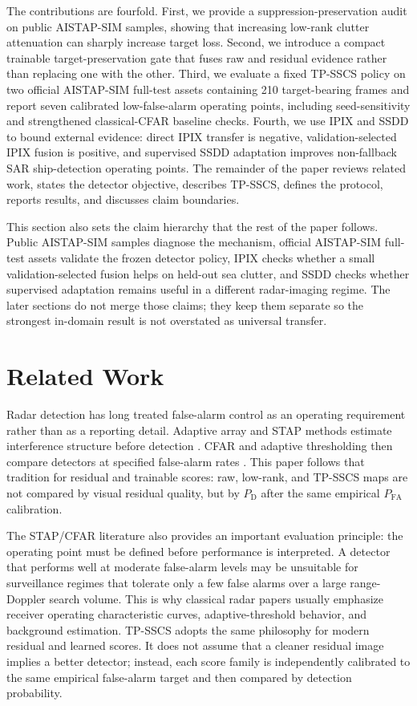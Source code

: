 \documentclass[journal]{IEEEtran}
\begin{document}
The contributions are fourfold. First, we provide a suppression-preservation audit on public AISTAP-SIM samples, showing that increasing low-rank clutter attenuation can sharply increase target loss. Second, we introduce a compact trainable target-preservation gate that fuses raw and residual evidence rather than replacing one with the other. Third, we evaluate a fixed TP-SSCS policy on two official AISTAP-SIM full-test assets containing 210 target-bearing frames and report seven calibrated low-false-alarm operating points, including seed-sensitivity and strengthened classical-CFAR baseline checks. Fourth, we use IPIX and SSDD to bound external evidence: direct IPIX transfer is negative, validation-selected IPIX fusion is positive, and supervised SSDD adaptation improves non-fallback SAR ship-detection operating points. The remainder of the paper reviews related work, states the detector objective, describes TP-SSCS, defines the protocol, reports results, and discusses claim boundaries.

This section also sets the claim hierarchy that the rest of the paper follows. Public AISTAP-SIM samples diagnose the mechanism, official AISTAP-SIM full-test assets validate the frozen detector policy, IPIX checks whether a small validation-selected fusion helps on held-out sea clutter, and SSDD checks whether supervised adaptation remains useful in a different radar-imaging regime. The later sections do not merge those claims; they keep them separate so the strongest in-domain result is not overstated as universal transfer.

\section{Related Work}

Radar detection has long treated false-alarm control as an operating requirement rather than as a reporting detail. Adaptive array and STAP methods estimate interference structure before detection \cite{reed1974adaptive,melvin2004stap,melvin2014stap}. CFAR and adaptive thresholding then compare detectors at specified false-alarm rates \cite{rohling1983cfar,kelly1986adaptive,gandhi1988cfar}. This paper follows that tradition for residual and trainable scores: raw, low-rank, and TP-SSCS maps are not compared by visual residual quality, but by $P_{\mathrm{D}}$ after the same empirical $P_{\mathrm{FA}}$ calibration.

The STAP/CFAR literature also provides an important evaluation principle: the operating point must be defined before performance is interpreted. A detector that performs well at moderate false-alarm levels may be unsuitable for surveillance regimes that tolerate only a few false alarms over a large range-Doppler search volume. This is why classical radar papers usually emphasize receiver operating characteristic curves, adaptive-threshold behavior, and background estimation. TP-SSCS adopts the same philosophy for modern residual and learned scores. It does not assume that a cleaner residual image implies a better detector; instead, each score family is independently calibrated to the same empirical false-alarm target and then compared by detection probability.
\end{document}
